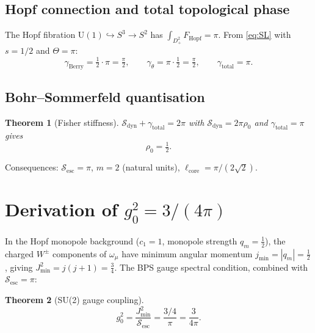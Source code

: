\documentclass[12pt]{article}
\newtheorem{theorem}{Theorem}[section]
\theoremstyle{definition}
\theoremstyle{remark}
\begin{document}
\subsection{Hopf connection and total topological phase}

The Hopf fibration $\mathrm{U}(1)\hookrightarrow S^3\to S^2$ has
$\int_{D^2_+}F_{\mathrm{Hopf}}=\pi$.  From \eqref{eq:SL} with
$s=1/2$ and $\Theta=\pi$:
\begin{equation}
\gamma_{\mathrm{Berry}}=\tfrac{1}{2}\cdot\pi=\tfrac{\pi}{2},\qquad
\gamma_\theta=\pi\cdot\tfrac{1}{2}=\tfrac{\pi}{2},\qquad
\gamma_{\mathrm{total}}=\pi.
\end{equation}

\subsection{Bohr--Sommerfeld quantisation}

\begin{theorem}[Fisher stiffness]
\label{thm:rho0}
$\mathcal{S}_{\mathrm{dyn}}+\gamma_{\mathrm{total}}=2\pi$ with
$\mathcal{S}_{\mathrm{dyn}}=2\pi\rho_0$ and $\gamma_{\mathrm{total}}=\pi$ gives
\begin{equation}\boxed{\rho_0=\tfrac{1}{2}.}\end{equation}
\end{theorem}

\noindent Consequences: $\mathcal{S}_{\mathrm{esc}}=\pi$,
$m=2$ (natural units), $\ell_{\mathrm{core}}=\pi/(2\sqrt{2})$.

\section{Derivation of $g_0^2=3/(4\pi)$}
\label{sec:g0}

In the Hopf monopole background ($c_1=1$, monopole strength $q_m=\tfrac{1}{2}$),
the charged $W^\pm$ components of $\omega_\mu$ have minimum angular
momentum $j_{\min}=|q_m|=\tfrac{1}{2}$, giving
$J^2_{\min}=j(j+1)=\tfrac{3}{4}$.  The BPS gauge spectral condition,
combined with $\mathcal{S}_{\mathrm{esc}}=\pi$:

\begin{theorem}[SU(2) gauge coupling]
\label{thm:g0}
\begin{equation}
\boxed{g_0^2=\frac{J^2_{\min}}{\mathcal{S}_{\mathrm{esc}}}=\frac{3/4}{\pi}=\frac{3}{4\pi}.}
\end{equation}
\end{theorem}
\end{document}
